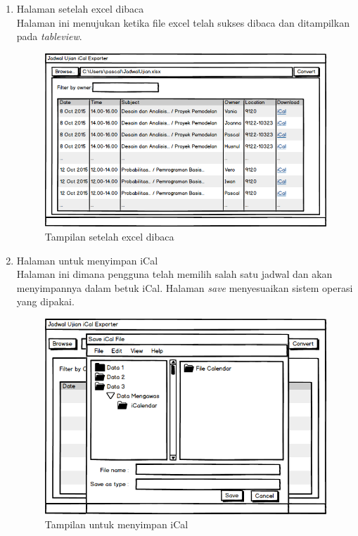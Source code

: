 \begin{enumerate}
\begin{figure}[H]
		\end{figure}
	\item Halaman setelah excel dibaca\\
	Halaman ini menujukan ketika file excel telah sukses dibaca dan ditampilkan pada \textit{tableview}.
		\begin{figure}[H]
		\centering
		\includegraphics[scale=0.5]{Gambar/antarmuka2}
		\caption{Tampilan setelah excel dibaca}
		\label{fig:excel_dibaca}
		\end{figure}
	\item Halaman untuk menyimpan iCal\\
	Halaman ini dimana pengguna telah memilih salah satu jadwal dan akan menyimpannya dalam betuk iCal. Halaman \textit{save} menyesuaikan sistem operasi yang dipakai. 
		\begin{figure}[H]
		\centering
		\includegraphics[scale=0.5]{Gambar/antarmuka4}
		\caption{Tampilan untuk menyimpan iCal}
		\label{fig:jadwalpng}
		\end{figure}
\end{enumerate}

